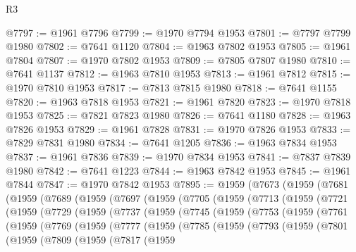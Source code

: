 \begin{lexlean}{R3}
\begin{coremodule}
@7797 := @1961 @7796
@7799 := @1970 @7794 @1953
@7801 := @7797 @7799 @1980
@7802 := @7641 @1120
@7804 := @1963 @7802 @1953
@7805 := @1961 @7804
@7807 := @1970 @7802 @1953
@7809 := @7805 @7807 @1980
@7810 := @7641 @1137
@7812 := @1963 @7810 @1953
@7813 := @1961 @7812
@7815 := @1970 @7810 @1953
@7817 := @7813 @7815 @1980
@7818 := @7641 @1155
@7820 := @1963 @7818 @1953
@7821 := @1961 @7820
@7823 := @1970 @7818 @1953
@7825 := @7821 @7823 @1980
@7826 := @7641 @1180
@7828 := @1963 @7826 @1953
@7829 := @1961 @7828
@7831 := @1970 @7826 @1953
@7833 := @7829 @7831 @1980
@7834 := @7641 @1205
@7836 := @1963 @7834 @1953
@7837 := @1961 @7836
@7839 := @1970 @7834 @1953
@7841 := @7837 @7839 @1980
@7842 := @7641 @1223
@7844 := @1963 @7842 @1953
@7845 := @1961 @7844
@7847 := @1970 @7842 @1953
@7895 := @1959
    (@7673
      (@1959
        (@7681
          (@1959
            (@7689
              (@1959
                (@7697
                  (@1959
                    (@7705
                      (@1959
                        (@7713
                          (@1959
                            (@7721
                              (@1959
                                (@7729
                                  (@1959
                                    (@7737
                                      (@1959
                                        (@7745
                                          (@1959
                                            (@7753
                                              (@1959
                                                (@7761
                                                  (@1959
                                                    (@7769
                                                      (@1959
                                                        (@7777
                                                          (@1959
                                                            (@7785
                                                              (@1959
                                                                (@7793
                                                                  (@1959
                                                                    (@7801
                                                                      (@1959
                                                                        (@7809
                                                                          (@1959
                                                                            (@7817
                                                                              (@1959

\end{coremodule}
\end{lexlean}

